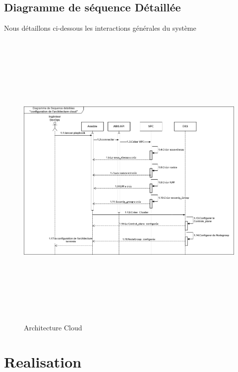 \subsection{\Large Diagramme de séquence Détaillée}
\textsf{\selectfont{}Nous détaillons ci-dessous les interactions générales du système }
\begin{figure}[H]
    \begin{center}
    \includegraphics[height=15cm,width=18cm]{seqd.drawio.png}
    \end{center}
    \caption{Architecture Cloud}
    \end{figure}




\section{Realisation}

